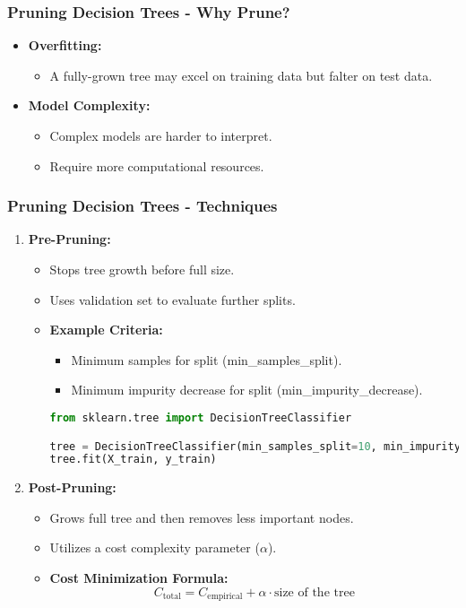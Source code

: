 \documentclass[aspectratio=169]{beamer}
\begin{document}
\begin{frame}[fragile]
    \frametitle{Pruning Decision Trees - Why Prune?}
    \begin{itemize}
        \item \textbf{Overfitting:}
        \begin{itemize}
            \item A fully-grown tree may excel on training data but falter on test data.
        \end{itemize}
        \item \textbf{Model Complexity:}
        \begin{itemize}
            \item Complex models are harder to interpret.
            \item Require more computational resources.
        \end{itemize}
    \end{itemize}
\end{frame}

\begin{frame}[fragile]
    \frametitle{Pruning Decision Trees - Techniques}
    \begin{enumerate}
        \item \textbf{Pre-Pruning:}
        \begin{itemize}
            \item Stops tree growth before full size.
            \item Uses validation set to evaluate further splits.
            \item \textbf{Example Criteria:}
            \begin{itemize}
                \item Minimum samples for split (min\_samples\_split).
                \item Minimum impurity decrease for split (min\_impurity\_decrease).
            \end{itemize}
            \begin{lstlisting}[language=Python]
from sklearn.tree import DecisionTreeClassifier

tree = DecisionTreeClassifier(min_samples_split=10, min_impurity_decrease=0.01)
tree.fit(X_train, y_train)
            \end{lstlisting}
        \end{itemize}
        
        \item \textbf{Post-Pruning:}
        \begin{itemize}
            \item Grows full tree and then removes less important nodes.
            \item Utilizes a cost complexity parameter ($\alpha$).
            \item \textbf{Cost Minimization Formula:}
            \begin{equation}
            C_{\text{total}} = C_{\text{empirical}} + \alpha \cdot \text{size of the tree}
            \end{equation}
        \end{itemize}
    \end{enumerate}
\end{frame}
\end{document}
